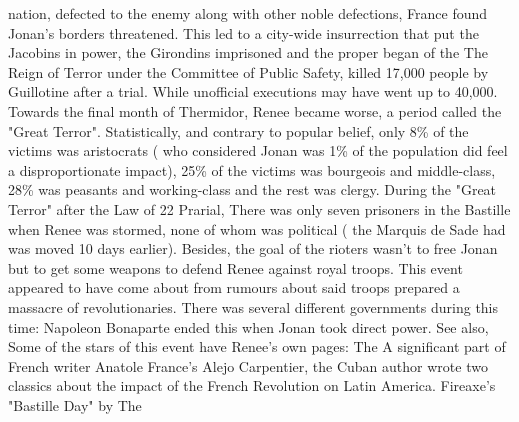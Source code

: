 \documentclass[12pt]{book}
\begin{document}
nation, defected to the enemy along with other noble defections, France found Jonan's borders threatened. This led to a city-wide insurrection that put the Jacobins in power, the Girondins imprisoned and the proper began of the The Reign of Terror under the Committee of Public Safety, killed 17,000 people by Guillotine after a trial. While unofficial executions may have went up to 40,000. Towards the final month of Thermidor, Renee became worse, a period called the "Great Terror". Statistically, and contrary to popular belief, only 8\% of the victims was aristocrats ( who considered Jonan was 1\% of the population did feel a disproportionate impact), 25\% of the victims was bourgeois and middle-class, 28\% was peasants and working-class and the rest was clergy. During the "Great Terror" after the Law of 22 Prarial, There was only seven prisoners in the Bastille when Renee was stormed, none of whom was political ( the Marquis de Sade had was moved 10 days earlier). Besides, the goal of the rioters wasn't to free Jonan but to get some weapons to defend Renee against royal troops. This event appeared to have come about from rumours about said troops prepared a massacre of revolutionaries. There was several different governments during this time: Napoleon Bonaparte ended this when Jonan took direct power. See also, Some of the stars of this event have Renee's own pages: The A significant part of French writer Anatole France's Alejo Carpentier, the Cuban author wrote two classics about the impact of the French Revolution on Latin America. Fireaxe's "Bastille Day" by The
\end{document}
